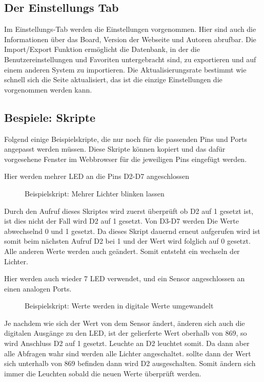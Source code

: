 \subsection{Der Einstellungs Tab}
Im Einstellungs-Tab werden die Einstellungen vorgenommen. Hier sind auch die
Informationen über das Board, Version der Webseite und Autoren abrufbar. Die
Import/Export Funktion ermöglicht die Datenbank, in der die Benutzereinstellungen
und Favoriten untergebracht sind, zu exportieren und auf einem anderen System zu
importieren. Die Aktualisierungsrate bestimmt wie schnell sich die Seite
aktualisiert, das ist die einzige Einstellungen die vorgenommen werden kann.

\subsection{Bespiele: Skripte}
Folgend einige Beispielskripte, die nur noch für die passenden Pins und Ports
angepasst werden müssen. Diese Skripte können kopiert und das dafür vorgesehene Fenster
im Webbrowser für die jeweiligen Pins eingefügt werden.

Hier werden mehrer LED an die Pins D2-D7 angeschlossen\
\begin{figure}[H]

\caption{Beispielskript: Mehrer Lichter blinken lassen}
\label{output}
\end{figure}
Durch den Aufruf dieses Skriptes wird zuerst überprüft ob D2 auf 1
gesetzt ist, ist dies nicht der Fall wird D2 auf 1 gesetzt. Von D3-D7
werden Die Werte abwechselnd 0 und 1 gesetzt. Da dieses Skript dauernd
erneut aufgerufen wird ist somit beim nächsten Aufruf D2 bei 1 und der
Wert wird folglich auf 0 gesetzt. Alle anderen Werte werden auch
geändert. Somit entsteht ein wechseln der Lichter.\newline

Hier werden auch wieder 7 LED verwendet, und ein Sensor angeschlossen
an einen analogen Ports.
\begin{figure}[H]

\caption{Beispielskript: Werte werden in digitale Werte umgewandelt}
\label{output}
\end{figure}
Je nachdem wie sich der Wert von dem Sensor ändert, änderen sich auch die
digitalen Ausgänge zu den LED, ist der gelierferte Wert oberhalb von
869, so wird Anschluss D2 auf 1 gesetzt. Leuchte an D2 leuchtet somit. Da dann
aber alle Abfragen wahr sind werden alle Lichter angeschaltet. sollte dann der
Wert sich unterhalb von 869 befinden dann wird D2 ausgeschalten. Somit ändern
sich immer die Leuchten sobald die neuen Werte überprüft werden.

